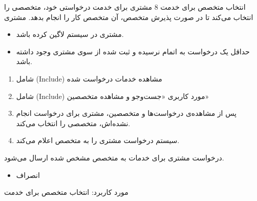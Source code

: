 {
\usecase
{انتخاب متخصص برای خدمت}
{8}
{مشتری برای خدمت درخواستی خود، متخصصی را انتخاب می‌کند تا در صورت پذیرش متخصص، آن متخصص کار را انجام بدهد.}
{مشتری}
{}
{	
	\begin{itemize}
		\vspace*{-0.6cm}
		\item 
		مشتری در سیستم لاگین کرده باشد.
		\item
		حداقل یک درخواست به اتمام نرسیده و ثبت شده از سوی مشتری وجود داشته باشد.
	\end{itemize}
}
{
	\vspace*{-0.6cm}
	\begin{enumerate}
		\item 
		شامل (Include) مشاهده خدمات درخواست‌ شده
	\item
	شامل ({Include}) مورد کاربری «جست‌وجو و مشاهده متخصصین»
	\item
	پس از مشاهده‌ی درخواست‌ها و متخصصین، مشتری برای درخواست انجام نشده‌اش، متخصصی را انتخاب می‌کند.
	\item
	سیستم درخواست مشتری را به متخصص اعلام می‌کند.
	\end{enumerate}
}
{
درخواست مشتری برای خدمات به متخصص مشخص شده ارسال می‌شود.
}
{
	\begin{itemize}
		\item
		انصراف
	\end{itemize}
}
{
	مورد کاربرد: انتخاب متخصص برای خدمت
}

}



